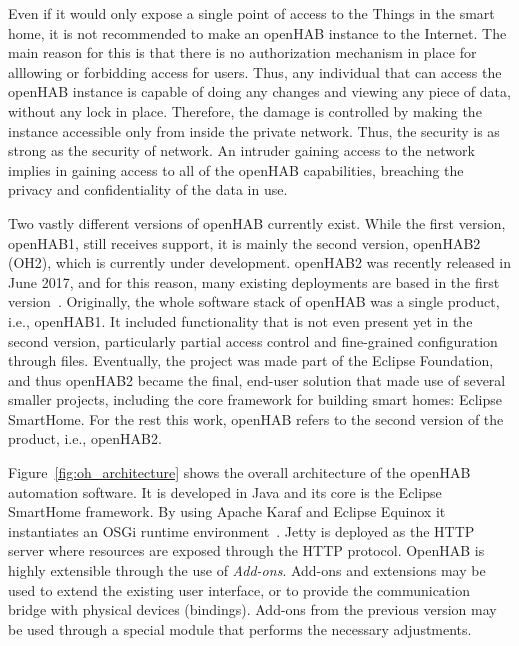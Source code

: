 \documentclass[12pt]{article}
\begin{document}
Even if it would only expose a single point of access to the Things in the smart home, it is not recommended to make an openHAB instance to the Internet. The main reason for this is that there is no authorization mechanism in place for alllowing or forbidding access for users. Thus, any individual that can access the openHAB instance is capable of doing any changes and viewing any piece of data, without any lock in place. Therefore, the damage is controlled by making the instance accessible only from inside the private network. Thus, the security is as strong as the security of network. An intruder gaining access to the network implies in gaining access to all of the openHAB capabilities, breaching the privacy and confidentiality of the data in use. 

Two vastly different versions of openHAB currently exist. While the first version, openHAB1, still receives support, it is mainly the second version, openHAB2 (OH2), which is currently under development. openHAB2 was recently released in June 2017, and for this reason, many existing deployments are based in the first version~\cite{openhab_01}. Originally, the whole software stack of openHAB was a single product, i.e., openHAB1. It included functionality that is not even present yet in the second version, particularly partial access control and fine-grained configuration through files. Eventually, the project was made part of the Eclipse Foundation, and thus openHAB2 became the final, end-user solution that made use of several smaller projects, including the core framework for building smart homes: Eclipse SmartHome. For the rest this work, openHAB refers to the second version of the product, i.e., openHAB2.

Figure~\ref{fig:oh_architecture} shows the overall architecture of the openHAB automation software. It is developed in Java and its core is the Eclipse SmartHome framework. By using Apache Karaf and Eclipse Equinox it instantiates an OSGi runtime environment~\cite{openhab_02}. Jetty is deployed as the HTTP server where resources are exposed through the HTTP protocol. OpenHAB is highly extensible through the use of \emph{Add-ons}. Add-ons and extensions may be used to extend the existing user interface, or to provide the communication bridge with physical devices (bindings). Add-ons from the previous version may be used through a special module that performs the necessary adjustments. 
\end{document}
